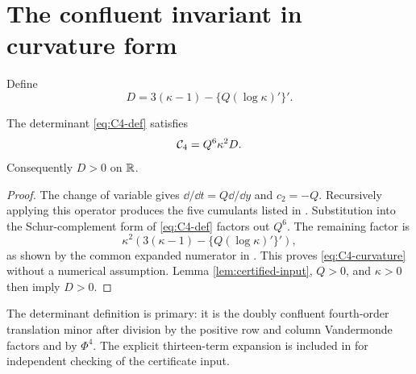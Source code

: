 \section{The confluent invariant in curvature form}\label{sec:confluent}

Define
\begin{equation}\label{eq:D-def}
 D=3(\kappa-1)-\{Q(\log\kappa)'\}'.
\end{equation}

\begin{lemma}\label{lem:C4-curvature}
The determinant \eqref{eq:C4-def} satisfies
\begin{equation}\label{eq:C4-curvature}
 \mathcal{C}_4=Q^6\kappa^2D.
\end{equation}
Consequently \(D>0\) on \(\mathbb{R}\).
\end{lemma}

\begin{proof}
The change of variable gives \(\dd/\dd t=Q\dd/\dd y\) and \(c_2=-Q\).
Recursively applying this operator produces the five cumulants listed in
. Substitution into the Schur-complement form of
\eqref{eq:C4-def} factors out \(Q^6\). The remaining factor is
\[
 \kappa^2\left(3(\kappa-1)-\{Q(\log\kappa)'\}'\right),
\]
as shown by the common expanded numerator in . This proves
\eqref{eq:C4-curvature} without a numerical assumption. Lemma
\ref{lem:certified-input}, \(Q>0\), and \(\kappa>0\) then imply \(D>0\).
\end{proof}

The determinant definition is primary: it is the doubly confluent
fourth-order translation minor after division by the positive row and column
Vandermonde factors and by \(\Phi^4\). The explicit thirteen-term expansion is
included in  for independent checking of the certificate
input.

